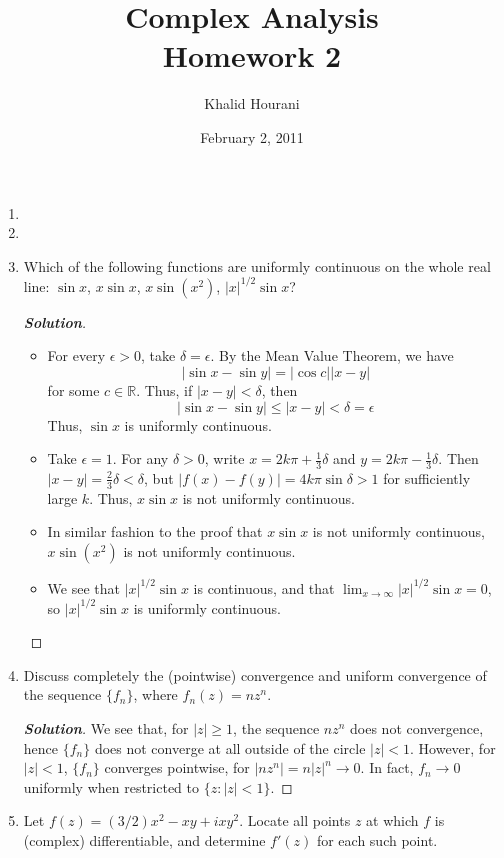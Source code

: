 \documentclass[12pt,leqno]{book}
\title{Complex Analysis\\\large Homework 2}
\date{February 2, 2011}
\author{Khalid Hourani}
\theoremstyle{definition}
\newcommand{\R}{\mathbb{R}}
\newenvironment{Solution}{\begin{proof}[\textnormal{\textbf{Solution}}]}{\end{proof}}
\begin{document}
 \begin{titlepage}
  \maketitle
 \end{titlepage}

\begin{enumerate}
 \item 
 \item 
 \item Which of the following functions are uniformly continuous on the whole real line: $\sin x$, $x\sin x$, $x\sin(x^2)$, $|x|^{1/2}\sin x$?
  \begin{Solution}\indent
   \begin{itemize}
    \item For every $\epsilon>0$, take $\delta=\epsilon$. By the Mean Value Theorem, we have \[|\sin x-\sin y|=|\cos c||x-y|\] for some $c\in\R$. Thus, if $|x-y|<\delta$, then \[|\sin x-\sin y|\leq|x-y|<\delta=\epsilon\] Thus, $\sin x$ is uniformly continuous.  
    \item Take $\epsilon=1$. For any $\delta>0$, write $x=2k\pi+\frac{1}{3}\delta$ and $y=2k\pi-\frac{1}{3}\delta$. Then $|x-y|=\frac{2}{3}\delta<\delta$, but $|f(x)-f(y)|=4k\pi\sin\delta>1$ for sufficiently large $k$. Thus, $x\sin x$ is not uniformly continuous.
    \item In similar fashion to the proof that $x\sin x$ is not uniformly continuous, $x\sin(x^2)$ is not uniformly continuous.
    \item We see that $|x|^{1/2}\sin x$ is continuous, and that $\lim_{x\to\infty}|x|^{1/2}\sin x=0$, so $|x|^{1/2}\sin x$ is uniformly continuous.\qedhere
   \end{itemize}
  \end{Solution}
 \item Discuss completely the (pointwise) convergence and uniform convergence of the sequence $\{f_n\}$, where $f_n(z)=nz^n$. 
  \begin{Solution}
   We see that, for $|z|\geq1$, the sequence $nz^n$ does not convergence, hence $\{f_n\}$ does not converge at all outside of the circle $|z|<1$. However, for $|z|<1$, $\{f_n\}$ converges pointwise, for $|nz^n|=n|z|^n\to0$. In fact, $f_n\to0$ uniformly when restricted to $\{z:|z|<1\}$. 
  \end{Solution}
 \item Let $f(z)=(3/2)x^2-xy+ixy^2$. Locate all points $z$ at which $f$ is (complex) differentiable, and determine $f'(z)$ for each such point.

\end{enumerate}
\end{document}
